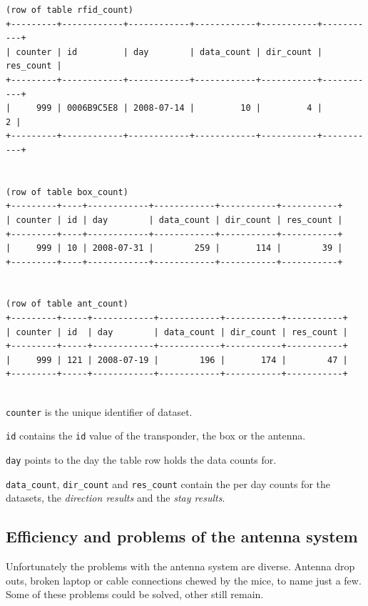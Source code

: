 \codescript
\begin{lstlisting}[frame=none]
(row of table rfid_count)
+---------+------------+------------+------------+-----------+-----------+
| counter | id         | day        | data_count | dir_count | res_count |
+---------+------------+------------+------------+-----------+-----------+
|     999 | 0006B9C5E8 | 2008-07-14 |         10 |         4 |         2 | 
+---------+------------+------------+------------+-----------+-----------+


(row of table box_count)
+---------+----+------------+------------+-----------+-----------+
| counter | id | day        | data_count | dir_count | res_count |
+---------+----+------------+------------+-----------+-----------+
|     999 | 10 | 2008-07-31 |        259 |       114 |        39 | 
+---------+----+------------+------------+-----------+-----------+


(row of table ant_count)
+---------+-----+------------+------------+-----------+-----------+
| counter | id  | day        | data_count | dir_count | res_count |
+---------+-----+------------+------------+-----------+-----------+
|     999 | 121 | 2008-07-19 |        196 |       174 |        47 | 
+---------+-----+------------+------------+-----------+-----------+


\end{lstlisting}

\begin{mydesc}
	\item \lstinline|counter| is the unique identifier of dataset.
	\item \lstinline|id| contains the \lstinline|id| value of the transponder, the box or the antenna.
	\item \lstinline|day| points to the day the table row holds the data counts for.
	\item \lstinline|data_count|, \lstinline|dir_count| and \lstinline|res_count| contain the per day counts for the datasets, the \textit{direction results} and the \textit{stay results}.
\end{mydesc}

\subsection{Efficiency and problems of the antenna system}
\label{subsec:problems}

Unfortunately the problems with the antenna system are diverse. Antenna drop outs, broken laptop or cable connections chewed by the mice, to name just a few. Some of these problems could be solved, other still remain.

